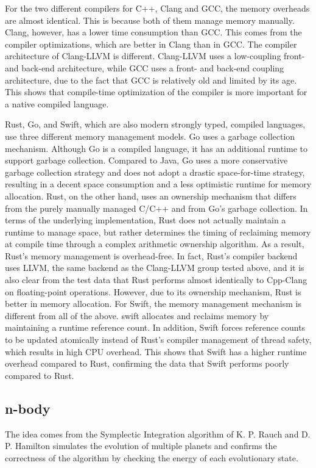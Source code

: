 For the two different compilers for C++, Clang and GCC, the memory overheads are almost identical. This is because both of them manage memory manually. Clang, however, has a lower time consumption than GCC. This comes from the compiler optimizations, which are better in Clang than in GCC. The compiler architecture of Clang-LLVM is different. Clang-LLVM uses a low-coupling front- and back-end architecture, while GCC uses a front- and back-end coupling architecture, due to the fact that GCC is relatively old and limited by its age. This shows that compile-time optimization of the compiler is more important for a native compiled language.

Rust, Go, and Swift, which are also modern strongly typed, compiled languages, use three different memory management models. Go uses a garbage collection mechanism. Although Go is a compiled language, it has an additional runtime to support garbage collection. Compared to Java, Go uses a more conservative garbage collection strategy and does not adopt a drastic space-for-time strategy, resulting in a decent space consumption and a less optimistic runtime for memory allocation. Rust, on the other hand, uses an ownership mechanism that differs from the purely manually managed C/C++ and from Go's garbage collection. In terms of the underlying implementation, Rust does not actually maintain a runtime to manage space, but rather determines the timing of reclaiming memory at compile time through a complex arithmetic ownership algorithm. As a result, Rust's memory management is overhead-free. In fact, Rust's compiler backend uses LLVM, the same backend as the Clang-LLVM group tested above, and it is also clear from the test data that Rust performs almost identically to Cpp-Clang on floating-point operations. However, due to its ownership mechanism, Rust is better in memory allocation. For Swift, the memory management mechanism is different from all of the above. swift allocates and reclaims memory by maintaining a runtime reference count. In addition, Swift forces reference counts to be updated atomically instead of Rust's compiler management of thread safety, which results in high CPU overhead. This shows that Swift has a higher runtime overhead compared to Rust, confirming the data that Swift performs poorly compared to Rust.

\subsection{n-body}

The idea comes from the Symplectic Integration algorithm of K. P. Rauch and D. P. Hamilton simulates the evolution of multiple planets and confirms the correctness of the algorithm by checking the energy of each evolutionary state.

